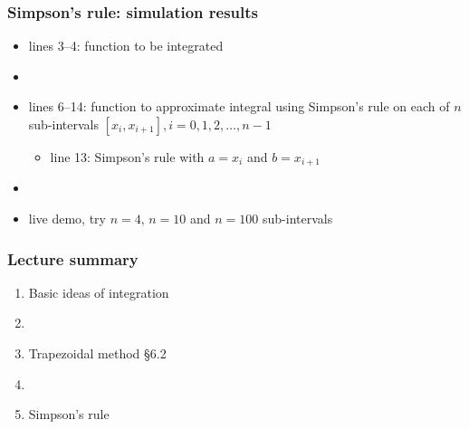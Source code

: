 \documentclass[english,14pt]{beamer}
\newcommand\red[1]{{\color{red} #1}}
\begin{document}

\begin{frame}[fragile]

\frametitle{Simpson's rule: simulation results}

\begin{itemize}
	\item lines 3--4: function to be integrated
	\item[]
	\item lines 6--14: function to approximate integral using Simpson's rule on each of $n$ sub-intervals $[x_i,x_{i+1}], i = 0,1,2,\ldots,n-1$
	\begin{itemize}
		\item line 13: Simpson's rule with $a=x_i$ and $b=x_{i+1}$
	\end{itemize}
	\item[]
	\item live demo, try $n=4$, $n=10$ and $n=100$ sub-intervals
\end{itemize}

\end{frame}


\begin{frame}[fragile]

\frametitle{Lecture summary}

\begin{enumerate}
	\item Basic ideas of integration
	
	\item[]
	
	\item Trapezoidal method \red{\S6.2}
	
%	
	
	\item[]
	
	\item Simpson's rule
	
\end{enumerate}

\end{frame}
\end{document}
